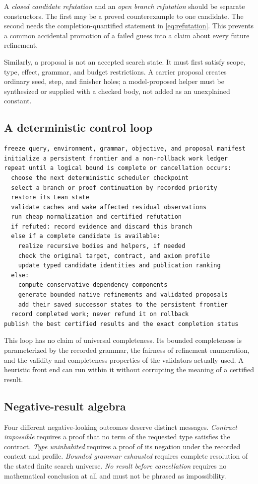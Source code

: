 \documentclass[11pt,a4paper]{article}
\theoremstyle{definition}
\theoremstyle{remark}
\begin{document}
A \emph{closed candidate refutation} and an \emph{open branch refutation} should
be separate constructors. The first may be a proved counterexample to one
candidate. The second needs the completion-quantified statement in
\eqref{eq:refutation}. This prevents a common accidental promotion of a failed
guess into a claim about every future refinement.

Similarly, a proposal is not an accepted search state. It must first satisfy
scope, type, effect, grammar, and budget restrictions. A carrier proposal
creates ordinary seed, step, and finisher holes; a model-proposed helper must
be synthesized or supplied with a checked body, not added as an unexplained
constant.

\subsection{A deterministic control loop}
\begin{lstlisting}
freeze query, environment, grammar, objective, and proposal manifest
initialize a persistent frontier and a non-rollback work ledger
repeat until a logical bound is complete or cancellation occurs:
  choose the next deterministic scheduler checkpoint
  select a branch or proof continuation by recorded priority
  restore its Lean state
  validate caches and wake affected residual observations
  run cheap normalization and certified refutation
  if refuted: record evidence and discard this branch
  else if a complete candidate is available:
    realize recursive bodies and helpers, if needed
    check the original target, contract, and axiom profile
    update typed candidate identities and publication ranking
  else:
    compute conservative dependency components
    generate bounded native refinements and validated proposals
    add their saved successor states to the persistent frontier
  record completed work; never refund it on rollback
publish the best certified results and the exact completion status
\end{lstlisting}

This loop has no claim of universal completeness. Its bounded completeness is
parameterized by the recorded grammar, the fairness of refinement enumeration,
and the validity and completeness properties of the validators actually used.
A heuristic front end can run within it without corrupting the meaning of a
certified result.

\subsection{Negative-result algebra}
Four different negative-looking outcomes deserve distinct messages.
\emph{Contract impossible} requires a proof that no term of the requested type
satisfies the contract. \emph{Type uninhabited} requires a proof of its
negation under the recorded context and profile. \emph{Bounded grammar
exhausted} requires complete resolution of the stated finite search universe.
\emph{No result before cancellation} requires no mathematical conclusion at
all and must not be phrased as impossibility.
\end{document}
